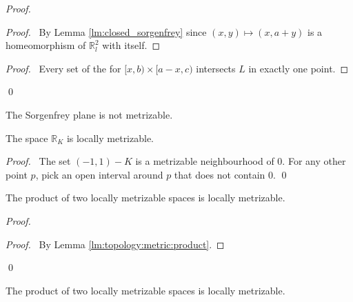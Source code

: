\begin{proof}
  \pf
  \step{<1>2}{\pick\ $a > 0$ such that $[0,a)^2 \subseteq U$}
  \begin{proof}
    \pf\ By Lemma \ref{lm:closed_sorgenfrey} since $(x,y) \mapsto (x,a+y)$ is
    a homeomorphism of $\mathbb{R}_l^2$ with itself.
  \end{proof}
  \step{<1>5}{\pflet{$\mathcal{U} = \{ U \setminus L \} \cup \{ ([x,b) \times
  [a-x,c)) \cap U : b > a, c > a - x \}$}}
  \begin{proof}
    \pf\ Every set of the for $[x,b) \times [a-x,c)$ intersects $L$ in exactly
    one point.
  \end{proof}
  \qed
\end{proof}

\begin{cor}
  The Sorgenfrey plane is not metrizable.
\end{cor}

\begin{prop}
  The space $\mathbb{R}_K$ is locally metrizable.
\end{prop}

\begin{proof}
  \pf\ The set $(-1, 1) - K$ is a metrizable neighbourhood of 0. For any other
  point $p$, pick an open interval around $p$ that does not contain 0. \qed
\end{proof}
\begin{prop}
  The product of two locally metrizable spaces is locally metrizable.
\end{prop}

\begin{proof}
  \pf
  \begin{proof}
    \pf\ By Lemma \ref{lm:topology:metric:product}.
  \end{proof}
  \qed
\end{proof}


\begin{prop}
  The product of two locally metrizable spaces is locally metrizable.
\end{prop}


